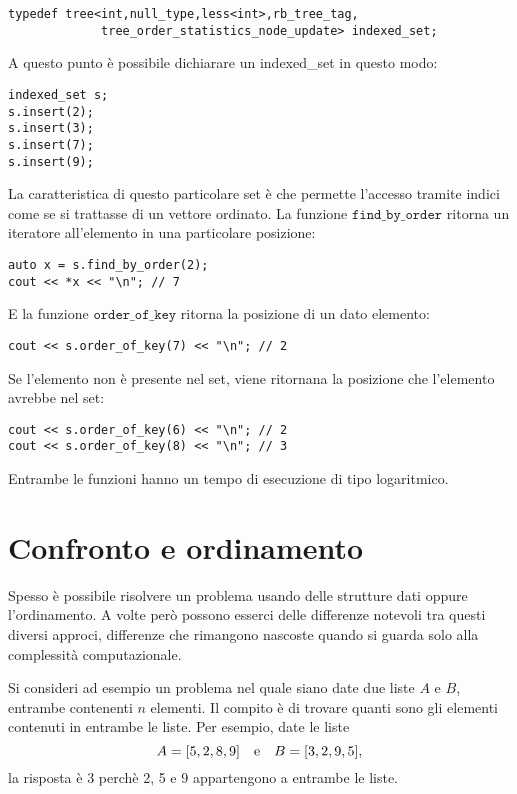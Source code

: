 \begin{lstlisting}
typedef tree<int,null_type,less<int>,rb_tree_tag,
             tree_order_statistics_node_update> indexed_set; 
\end{lstlisting}

A questo punto è possibile dichiarare un indexed\_set in questo modo:
\begin{lstlisting}
indexed_set s;
s.insert(2);
s.insert(3);
s.insert(7);
s.insert(9);
\end{lstlisting}

La caratteristica di questo particolare set è che permette l'accesso
tramite indici come se si trattasse di un vettore ordinato.
La funzione $\texttt{find\_by\_order}$ ritorna un iteratore
all'elemento in una particolare posizione:
\begin{lstlisting}
auto x = s.find_by_order(2);
cout << *x << "\n"; // 7
\end{lstlisting}
E la funzione $\texttt{order\_of\_key}$
ritorna la posizione di un dato elemento:

\begin{lstlisting}
cout << s.order_of_key(7) << "\n"; // 2
\end{lstlisting}
Se l'elemento non è presente nel set,
viene ritornana la posizione che l'elemento avrebbe nel set:
\begin{lstlisting}
cout << s.order_of_key(6) << "\n"; // 2
cout << s.order_of_key(8) << "\n"; // 3
\end{lstlisting}
Entrambe le funzioni hanno un tempo di esecuzione di tipo logaritmico.

\section{Confronto e ordinamento}

Spesso è possibile risolvere un problema 
usando delle strutture dati oppure l'ordinamento.
A volte però possono esserci delle differenze notevoli
tra questi diversi approci, differenze che rimangono
nascoste quando si guarda solo alla complessità computazionale.

Si consideri ad esempio un problema nel
quale siano date due liste $A$ e $B$,
entrambe contenenti $n$ elementi.
Il compito è di trovare quanti sono gli elementi
contenuti in entrambe le liste.
Per esempio, date le liste
\[A = [5,2,8,9] \hspace{10px} \textrm{e} \hspace{10px} B = [3,2,9,5],\]
la risposta è 3 perchè 2, 5 e 9 appartengono 
a entrambe le liste.

